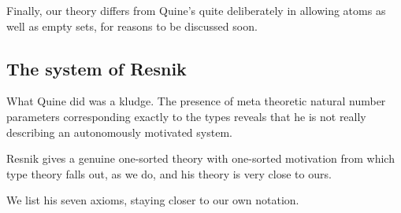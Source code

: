 \documentclass[12pt]{article}
\begin{document}
Finally, our theory differs from Quine's quite deliberately in allowing atoms as well as empty sets, for reasons to be discussed soon.

\subsection{The system of Resnik}

What Quine did was a kludge.  The presence of meta theoretic natural number parameters corresponding exactly to the types
reveals that he is not really describing an autonomously motivated system.

Resnik gives a genuine one-sorted theory with one-sorted motivation from which type theory falls out, as we do, and his theory is very close to ours.

We list his seven axioms, staying closer to our own notation.
\end{document}
